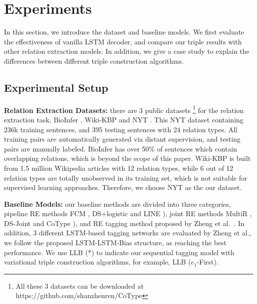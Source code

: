 \section{Experiments}
\label{sec:eval}
In this section, we introduce the dataset and baseline models.
We first evaluate the effectiveness of vanilla LSTM decoder,
and compare our triple results with other relation extraction models.
In addition, we give a case study to explain the differences between different
triple construction algorithms.


\subsection{Experimental Setup}

\noindent
\textbf{Relation Extraction Datasets:}
there are 3 public datasets \footnote{ All these 3 datasets can be downloaded at
https://github.com/shanzhenren/CoType} for the relation extraction task,
BioInfer \cite{pyysalo2007bioinfer}, Wiki-KBP \cite{ling2012fine} and NYT \cite{Ren2017}.
This NYT dataset containing 236k training sentences, and 395 testing sentences
with 24 relation types.
All training pairs are automatically generated via distant supervision,
and testing pairs are manually labeled.
BioInfer has over 50\% of sentences which contain overlapping relations, which is
beyond the scope of this paper.
Wiki-KBP is built from 1.5 million Wikipedia articles with 12 relation types,
while 6 out of 12 relation types are totally unobserved in its training set,
which is not suitable for supervised learning approaches.
Therefore, we choose NYT as the our dataset.

\noindent
\textbf{Baseline Models:}
our baseline methods are divided into three categories, pipeline RE
methods FCM \cite{Gormley2015}, DS+logistic
\cite{Mintz2009} and LINE \cite{Tang2015}), joint RE methods
MultiR \cite{Hoffmann2011}, DS-Joint \cite{Li2014}
and CoType \cite{Ren2017}), and RE tagging method proposed by Zheng et
al.~.
In addition, 3 different LSTM-based tagging networks are evaluated by Zheng et al.,
we follow the proposed LSTM-LSTM-Bias structure, as reaching the best performance.
We use LLB (*) to indicate our sequential tagging model with variational triple
construction algorithms, for example, LLB ($e_1$-First).

